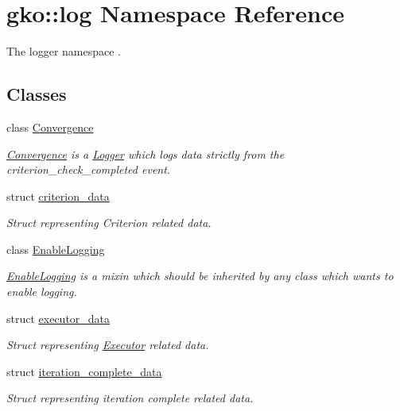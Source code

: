 \hypertarget{namespacegko_1_1log}{}\section{gko\+:\+:log Namespace Reference}
\label{namespacegko_1_1log}


The logger namespace .  


\subsection*{Classes}
\begin{DoxyCompactItemize}
\item 
class \hyperlink{classgko_1_1log_1_1Convergence}{Convergence}
\begin{DoxyCompactList}\small\item\em \hyperlink{classgko_1_1log_1_1Convergence}{Convergence} is a \hyperlink{classgko_1_1log_1_1Logger}{Logger} which logs data strictly from the {\ttfamily criterion\+\_\+check\+\_\+completed} event. \end{DoxyCompactList}\item 
struct \hyperlink{structgko_1_1log_1_1criterion__data}{criterion\+\_\+data}
\begin{DoxyCompactList}\small\item\em Struct representing Criterion related data. \end{DoxyCompactList}\item 
class \hyperlink{classgko_1_1log_1_1EnableLogging}{Enable\+Logging}
\begin{DoxyCompactList}\small\item\em \hyperlink{classgko_1_1log_1_1EnableLogging}{Enable\+Logging} is a mixin which should be inherited by any class which wants to enable logging. \end{DoxyCompactList}\item 
struct \hyperlink{structgko_1_1log_1_1executor__data}{executor\+\_\+data}
\begin{DoxyCompactList}\small\item\em Struct representing \hyperlink{classgko_1_1Executor}{Executor} related data. \end{DoxyCompactList}\item 
struct \hyperlink{structgko_1_1log_1_1iteration__complete__data}{iteration\+\_\+complete\+\_\+data}
\begin{DoxyCompactList}\small\item\em Struct representing iteration complete related data. \end{DoxyCompactList}\item 

\end{DoxyCompactItemize}
